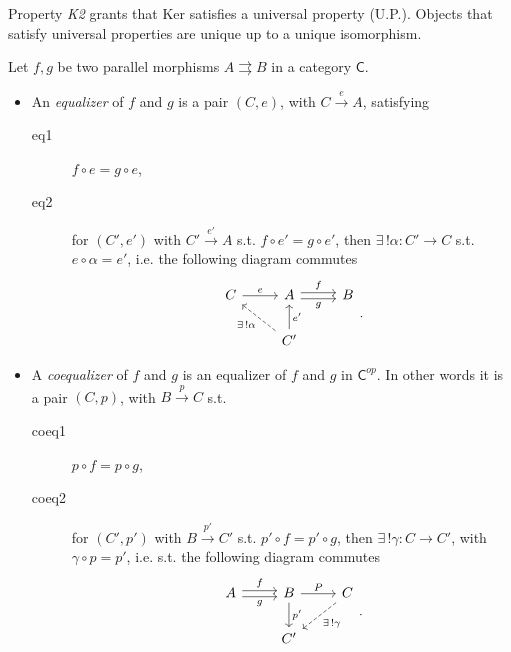 \begin{rem}
	Property {\em K2} grants that Ker satisfies a universal property (U.P.).
	Objects that satisfy universal properties are unique up to a unique isomorphism. 
\end{rem}

\begin{defn}[(Co)equalizer]
	Let $f,g$ be two parallel morphisms $A \rightrightarrows B$ in a category $\mathsf{C}$.
	\begin{itemize}
		\item An {\em equalizer} of $f$ and $g$ is a pair $\left(C, e\right)$, with $C \xrightarrow{e} A$, satisfying
	\begin{description}
		\item[eq1] $f \circ e = g \circ e$,
		\item[eq2] for $\left(C', e'\right)$ with $C' \xrightarrow{e'} A$ s.t. $f \circ e' = g \circ e'$, then
			$\exists\, ! \alpha: C' \to C$ s.t. $e \circ \alpha = e'$, i.e. the following diagram commutes
			\begin{equation}
			\begin{tikzcd}
				C \arrow[r, "e", rightarrow] & A \arrow[r, "f", rightarrow, shift left=.5ex] \arrow[r, "g"', rightarrow, shift right=.5ex] & B\\
				    & C' \arrow[lu, "\exists\, ! \alpha", dashrightarrow] \arrow[u, "e'"', rightarrow] & 
			\end{tikzcd}
			.\end{equation} 
	\end{description}
	\item A {\em coequalizer} of $f$ and $g$ is an equalizer of $f$ and $g$ in $\mathsf{C}^{op}$.
		In other words it is a pair $\left(C, p\right)$, with $B \xrightarrow{p} C$ s.t.
		\begin{description}
			\item[coeq1] $p \circ f = p \circ g$,
			\item[coeq2] for $\left(C', p'\right)$ with $B \xrightarrow{p'} C'$ s.t. $p' \circ f = p' \circ g$, then $\exists\, ! \gamma: C \to C'$, with $\gamma \circ p = p'$, i.e. s.t. the following diagram commutes
			\begin{equation}
			\begin{tikzcd}
				A \arrow[r, "f", rightarrow, shift left=.5ex] \arrow[r, "g"', rightarrow, shift right=.5ex] & B \arrow[r, "P", rightarrow] \arrow[d, "p'", rightarrow] & C \arrow[dl, "\exists\, ! \gamma", dashrightarrow] \\
				    & C' & 
			\end{tikzcd}
			.\end{equation} 
		\end{description} 
	\end{itemize}
\end{defn}

